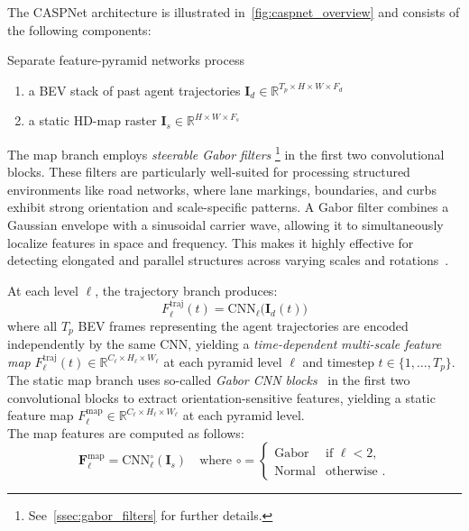 The CASPNet architecture is illustrated in~\autoref{fig:caspnet_overview} and consists of the following components:
\begin{description}[leftmargin=1em,itemsep=2pt]
\item[Dual FPN encoders.] Separate feature-pyramid networks process
\begin{enumerate}[label=\roman*)]
    \item a BEV stack of past agent trajectories \( \mathbf{I}_d\in\mathbb{R}^{T_p\times H\times W\times F_d} \)
    \item a static HD-map raster \( \mathbf{I}_s\in\mathbb{R}^{H\times W\times F_s} \)
\end{enumerate}

The map branch employs \emph{steerable Gabor filters}%
\footnote{See~\autoref{ssec:gabor_filters} for further details.}
in the first two convolutional blocks. These filters are particularly well-suited for processing structured environments like road networks, where lane markings, boundaries, and curbs exhibit strong orientation and scale-specific patterns. A Gabor filter combines a Gaussian envelope with a sinusoidal carrier wave, allowing it to simultaneously localize features in space and frequency. This makes it highly effective for detecting elongated and parallel structures across varying scales and rotations~\cite{steerableGaborFilters}.

At each level \( \ell \), the trajectory branch produces:
\begin{equation}
\label{eq:fpn_traj}
F^{\mathrm{traj}}_{\ell}(t) = \mathrm{CNN}_\ell\bigl(\mathbf{I}_{d}(t)\bigr)
\end{equation}
where all \( T_p \) BEV frames representing the agent trajectories are encoded independently by the same CNN, yielding a \emph{time-dependent} \emph{multi-scale feature map} \( F^{\mathrm{traj}}_{\ell}(t) \in \mathbb{R}^{C_\ell \times H_\ell \times W_\ell} \) at each pyramid level \(\ell\) and timestep \( t \in \{1,\dots,T_p\} \).\\
The static map branch uses so-called \emph{Gabor CNN blocks}~\cite{Luan2018GCNN} in the first two convolutional blocks to extract orientation-sensitive features, yielding a static feature map \( F_{\ell}^{\mathrm{map}} \in \mathbb{R}^{C_\ell \times H_\ell \times W_\ell} \) at each pyramid level.\\
The map features are computed as follows:
\begin{equation}
\label{eq:fpn_map}
\mathbf{F}_{\ell}^{\mathrm{map}}
= \mathrm{CNN}_\ell^{\circ}(\mathbf{I}_s) \quad \text{where } \circ = \begin{cases}
\mathrm{Gabor} & \text{if } \ell < 2, \\
\mathrm{Normal} & \text{otherwise }.
\end{cases}
\end{equation}


\end{description}
